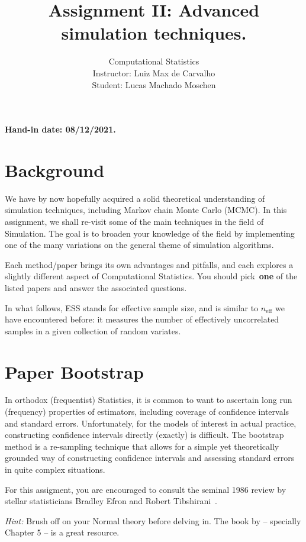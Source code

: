 \documentclass[a4paper,10pt, notitlepage]{report}
\title{Assignment II: Advanced simulation techniques.}
\author{Computational Statistics \\ Instructor: Luiz Max de Carvalho \\ Student: Lucas Machado Moschen}
\begin{document}
\maketitle

\textbf{Hand-in date: 08/12/2021.}

\section*{Background}

We have by now hopefully acquired a solid theoretical understanding of simulation techniques, including Markov chain Monte Carlo (MCMC).
In this assignment, we shall re-visit some of the main techniques in the field of Simulation.
The goal is to broaden your knowledge of the field by implementing one of the many variations on the general theme of simulation algorithms.

Each method/paper brings its own advantages and pitfalls, and each explores a slightly different aspect of Computational Statistics.
You should pick~\textbf{one} of the listed papers and answer the associated questions.

In what follows, ESS stands for effective sample size, and is similar to
$n_{\text{eff}}$ we have encountered before: it measures the number of
effectively uncorrelated samples in a given collection of random variates.

\section*{Paper Bootstrap~\citep{Efron1986}}

In orthodox (frequentist) Statistics, it is common to want to ascertain long run (frequency) properties of estimators, including coverage of confidence intervals and standard errors.
Unfortunately, for the models of interest in actual practice, constructing confidence intervals directly (exactly) is difficult.
The bootstrap method is a re-sampling technique that allows for a simple yet theoretically grounded way of constructing confidence intervals and assessing standard errors in quite complex situations.

For this assigment, you are encouraged to consult the seminal 1986 review by stellar statisticians Bradley Efron and Robert Tibshirani~\citep{Efron1986}.

\textit{Hint:} Brush off on your Normal theory before delving in.
The book by \cite{Schervish2012} -- specially Chapter 5 -- is a great resource.
\end{document}
